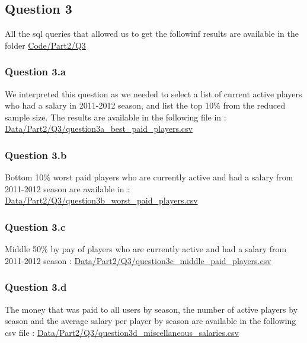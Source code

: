 
\subsection{Question 3}
\label{subsec:413}
All the sql queries that allowed us to get the followinf results are available in the folder \url{Code/Part2/Q3}

\subsubsection{Question 3.a}
\label{subsubsec:413a}
We interpreted this question as we needed to select a list of current active players who had a salary in 2011-2012 season, and list the top 10\% from the reduced sample size. The results are available in the following file in : \url{Data/Part2/Q3/question3a_best_paid_players.csv}

\subsubsection{Question 3.b}
\label{subsubsec:413b}
Bottom 10\% worst paid players who are currently active and had a salary from 2011-2012 season are available in : \url{Data/Part2/Q3/question3b_worst_paid_players.csv}

\subsubsection{Question 3.c}
\label{subsubsec:413c}
Middle 50\% by pay of players who are currently active and had a salary from 2011-2012 season : \url{Data/Part2/Q3/question3c_middle_paid_players.csv}

\subsubsection{Question 3.d}
\label{subsubsec:413d}
The money that was paid to all users by season, the number of active players by season and the average salary per player by season are available in the following csv file : \url{Data/Part2/Q3/question3d_miscellaneous_salaries.csv}
